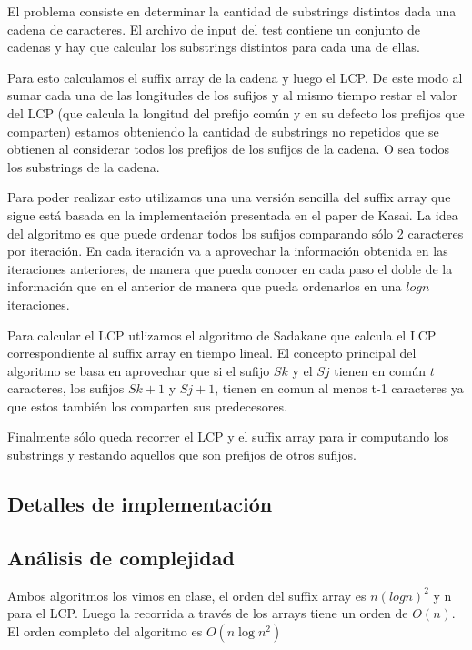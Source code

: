 El problema consiste en determinar la cantidad de substrings distintos dada
una cadena de caracteres. El archivo de input del test contiene un conjunto de
cadenas y hay que calcular los substrings distintos para cada una de ellas.

Para esto calculamos el suffix array de la cadena y luego el LCP. De este modo
al sumar cada una de las longitudes de los sufijos y al mismo tiempo restar el
valor del LCP (que calcula la longitud del prefijo común y en su defecto los
prefijos que comparten) estamos obteniendo la cantidad de substrings no
repetidos que se obtienen al considerar todos los prefijos de los sufijos de
la cadena. O sea todos los substrings de la cadena.

Para poder realizar esto utilizamos una una versión sencilla del suffix array
que sigue está basada en la implementación presentada en el paper de Kasai. La
idea del algoritmo es que puede ordenar todos los sufijos comparando sólo 2
caracteres por iteración. En cada iteración va a aprovechar la información
obtenida en las iteraciones anteriores, de manera que pueda conocer en cada
paso el doble de la información que en el anterior de manera que pueda
ordenarlos en una $log n$ iteraciones. 

Para calcular el LCP utlizamos el algoritmo de Sadakane que calcula el LCP
correspondiente al suffix array en tiempo lineal. El concepto principal del
algoritmo se basa en aprovechar que si el sufijo $S{k}$ y el $S{j}$ tienen en
común $t$ caracteres, los sufijos $S{k+1}$ y $S{j+1}$, tienen en comun al
menos t-1 caracteres ya que estos también los comparten sus predecesores.

Finalmente sólo queda recorrer el LCP y el suffix array para ir computando los
substrings y restando aquellos que son prefijos de otros sufijos.

\subsection*{Detalles de implementación}

\subsection*{Análisis de complejidad}

Ambos algoritmos los vimos en clase, el orden del suffix array es $n (log
n)^2$ y n para el LCP. Luego la recorrida a través de los arrays tiene un
orden de $O(n)$. El orden completo del algoritmo es $O(n\log n^2)$

